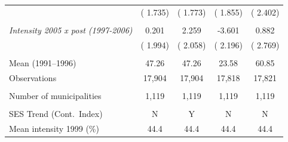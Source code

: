 \begin{tabular}{lcccc}
 & (       1.735) & (       1.773) & (       1.855) & (       2.402) \\ 
  & & & & \\ 
\textit{Intensity 2005 x post (1997-2006)} &        0.201 &        2.259 &       -3.601 &        0.882 \\ 
 & (       1.994) & (       2.058) & (       2.196) & (       2.769) \\ 
  & & & & \\ 
Mean (1991--1996) &        47.26 &        47.26 &        23.58 &        60.85 \\ 
Observations &       17,904 &       17,904 &       17,818 &       17,821 \\ 
  & & & & \\ 
Number of municipalities &        1,119 &        1,119 &        1,119 &        1,119 \\ 
  & & & & \\ 
SES Trend (Cont.\ Index) & N & Y & N & N \\ 
Mean intensity 1999 (\%) &   44.4 &   44.4 &   44.4 &   44.4 \\ 
\bottomrule
\end{tabular}